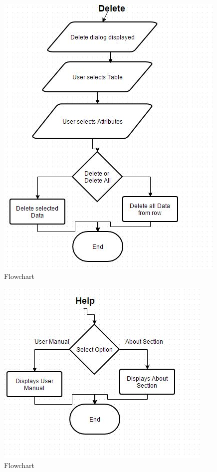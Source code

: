 \begin{figure}[H]
    \includegraphics[width=\textwidth]{DesignAlg8.JPG}
    \caption{Flowchart} \label{fig:Flowchart}
\end{figure}

\begin{figure}[H]
    \includegraphics[width=\textwidth]{DesignAlg9.JPG}
    \caption{Flowchart} \label{fig:Flowchart}
\end{figure}



